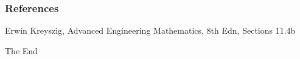 \documentclass{beamer}
\begin{document}

\begin{frame}
\frametitle{References}
\footnotesize{
\begin{thebibliography}{99} %
\newblock Erwin Kreyszig, Advanced Engineering Mathematics, 8th Edn, Sections 11.4b
\end{thebibliography}
}
\end{frame}



\begin{frame}
\Huge{\centerline{The End}}
\end{frame}
\end{document}
